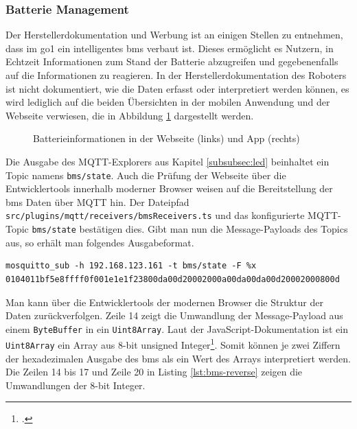 \subsubsection{Batterie Management}
\label{subsubsec:batterie-management}

Der Herstellerdokumentation und Werbung ist an einigen Stellen zu entnehmen, dass im \gls{go1} ein intelligentes \gls{bms} verbaut ist.
Dieses ermöglicht es Nutzern, in Echtzeit Informationen zum Stand der Batterie abzugreifen und gegebenenfalls auf die Informationen
zu reagieren.
In der Herstellerdokumentation des Roboters ist nicht dokumentiert, wie die Daten erfasst oder interpretiert werden können,
es wird lediglich auf die beiden Übersichten in der mobilen Anwendung und der Webseite verwiesen, die in Abbildung \ref{fig:bms-app-web}
dargestellt werden.

\begin{figure}[h]
    \caption{Batterieinformationen in der Webseite (links) und App (rechts)}\label{fig:bms-app-web}
\end{figure}

Die Ausgabe des MQTT-Explorers aus Kapitel \ref{subsubsec:led} beinhaltet ein Topic namens \texttt{bms/\allowbreak state}.
Auch die Prüfung der Webseite über die Entwicklertools innerhalb moderner Browser weisen auf die Bereitstellung der
\gls{bms} Daten über MQTT hin.
Der Dateipfad \texttt{src/\allowbreak plugins/\allowbreak mqtt/\allowbreak receivers/\allowbreak bms\allowbreak Receivers\allowbreak .ts}
und das konfigurierte MQTT-Topic \texttt{bms\allowbreak /state} bestätigen dies.
Gibt man nun die Message-Payloads des Topics aus, so erhält man folgendes Ausgabeformat.

\begin{lstlisting}
mosquitto_sub -h 192.168.123.161 -t bms/state -F %x
0104011bf5e8ffff0f001e1e1f23800da00d20002000a00da00da00d20002000800d
\end{lstlisting}

Man kann über die Entwicklertools der modernen Browser die Struktur der Daten zurückverfolgen.
Zeile \num{14} zeigt die Umwandlung der Message-Payload aus einem \texttt{Byte\allowbreak Buffer} in ein \texttt{Uint8Array}.
Laut der JavaScript-Dokumentation ist ein \texttt{Uint8Array} ein Array aus \num{8}-bit unsigned Integer\footcite{uint8array}.
Somit können je zwei Ziffern der hexadezimalen Ausgabe des \gls{bms} als ein Wert des Arrays interpretiert werden.
Die Zeilen \num{14} bis \num{17} und Zeile \num{20} in Listing \ref{lst:bms-reverse} zeigen die Umwandlungen der \num{8}-bit Integer.

